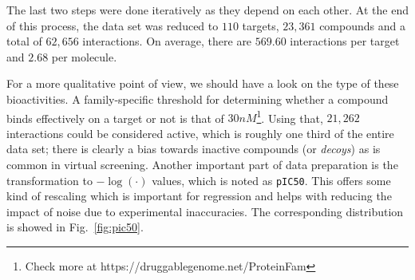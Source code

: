 \documentclass[10pt]{article}
\begin{document}
The last two steps were done iteratively as they depend on each other. At the end of this process, the data set was reduced to $110$ targets, $23,361$ compounds and a total of $62,656$ interactions. On average, there are $569.60$ interactions per target and $2.68$ per molecule. 

For a more qualitative point of view, we should have a look on the type of these bioactivities. A family-specific threshold for determining whether a compound binds effectively on a target or not is that of $30nM$\footnote{Check more at https://druggablegenome.net/ProteinFam}. Using that, $21,262$ interactions could be considered active, which is roughly one third of the entire data set; there is clearly a bias towards inactive compounds (or \textit{decoys}) as is common in virtual screening. Another important part of data preparation is the transformation to $-\log(\cdot)$ values, which is noted as \texttt{pIC50}. This offers some kind of rescaling which is important for regression and helps with reducing the impact of noise due to experimental inaccuracies. The corresponding distribution is showed in Fig.~\ref{fig:pic50}.
\end{document}
